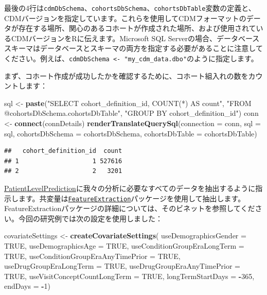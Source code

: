 \documentclass[
  11pt]{book}
\newenvironment{Shaded}{\begin{snugshade}}{\end{snugshade}}
\newcommand{\AttributeTok}[1]{\textcolor[rgb]{0.13,0.29,0.53}{#1}}
\newcommand{\ConstantTok}[1]{\textcolor[rgb]{0.56,0.35,0.01}{#1}}
\newcommand{\DecValTok}[1]{\textcolor[rgb]{0.00,0.00,0.81}{#1}}
\newcommand{\FunctionTok}[1]{\textcolor[rgb]{0.13,0.29,0.53}{\textbf{#1}}}
\newcommand{\NormalTok}[1]{#1}
\newcommand{\OtherTok}[1]{\textcolor[rgb]{0.56,0.35,0.01}{#1}}
\newcommand{\SpecialCharTok}[1]{\textcolor[rgb]{0.81,0.36,0.00}{\textbf{#1}}}
\newcommand{\StringTok}[1]{\textcolor[rgb]{0.31,0.60,0.02}{#1}}
\theoremstyle{definition}
\theoremstyle{definition}
\theoremstyle{definition}
\theoremstyle{definition}
\theoremstyle{remark}
\begin{document}
最後の4行は\texttt{cdmDbSchema}、\texttt{cohortsDbSchema}、\texttt{cohortsDbTable}変数の定義と、CDMバージョンを指定しています。これらを使用してCDMフォーマットのデータが存在する場所、関心のあるコホートが作成された場所、および使用されているCDMバージョンをRに伝えます。Microsoft SQL Serverの場合、データベーススキーマはデータベースとスキーマの両方を指定する必要があることに注意してください。例えば、\texttt{cdmDbSchema\ \textless{}-\ "my\_cdm\_data.dbo"}のように指定します。

まず、コホート作成が成功したかを確認するために、コホート組入れの数をカウントします：

\begin{Shaded}
\begin{Highlighting}[]
\NormalTok{sql }\OtherTok{\textless{}{-}} \FunctionTok{paste}\NormalTok{(}\StringTok{"SELECT cohort\_definition\_id, COUNT(*) AS count"}\NormalTok{,}
\StringTok{"FROM @cohortsDbSchema.cohortsDbTable"}\NormalTok{,}
\StringTok{"GROUP BY cohort\_definition\_id"}\NormalTok{)}
\NormalTok{conn }\OtherTok{\textless{}{-}} \FunctionTok{connect}\NormalTok{(connDetails)}
\FunctionTok{renderTranslateQuerySql}\NormalTok{(}\AttributeTok{connection =}\NormalTok{ conn,}
                        \AttributeTok{sql =}\NormalTok{ sql,}
                        \AttributeTok{cohortsDbSchema =}\NormalTok{ cohortsDbSchema,}
                        \AttributeTok{cohortsDbTable =}\NormalTok{ cohortsDbTable)}
\end{Highlighting}
\end{Shaded}

\begin{verbatim}
##   cohort_definition_id  count
## 1                    1 527616
## 2                    2   3201
\end{verbatim}

\href{https://ohdsi.github.io/PatientLevelPrediction/}{PatientLevelPrediction}に我々の分析に必要なすべてのデータを抽出するように指示します。共変量は\href{https://ohdsi.github.io/FeatureExtraction/}{\texttt{FeatureExtraction}}パッケージを使用して抽出します。FeatureExtractionパッケージの詳細については、そのビネットを参照してください。今回の研究例では次の設定を使用しました：

\begin{Shaded}
\begin{Highlighting}[]
\NormalTok{covariateSettings }\OtherTok{\textless{}{-}} \FunctionTok{createCovariateSettings}\NormalTok{(}
  \AttributeTok{useDemographicsGender =} \ConstantTok{TRUE}\NormalTok{,}
  \AttributeTok{useDemographicsAge =} \ConstantTok{TRUE}\NormalTok{,}
  \AttributeTok{useConditionGroupEraLongTerm =} \ConstantTok{TRUE}\NormalTok{,}
  \AttributeTok{useConditionGroupEraAnyTimePrior =} \ConstantTok{TRUE}\NormalTok{,}
  \AttributeTok{useDrugGroupEraLongTerm =} \ConstantTok{TRUE}\NormalTok{,}
  \AttributeTok{useDrugGroupEraAnyTimePrior =} \ConstantTok{TRUE}\NormalTok{,}
  \AttributeTok{useVisitConceptCountLongTerm =} \ConstantTok{TRUE}\NormalTok{,}
  \AttributeTok{longTermStartDays =} \SpecialCharTok{{-}}\DecValTok{365}\NormalTok{,}
  \AttributeTok{endDays =} \SpecialCharTok{{-}}\DecValTok{1}\NormalTok{)}
\end{Highlighting}
\end{Shaded}
\end{document}
